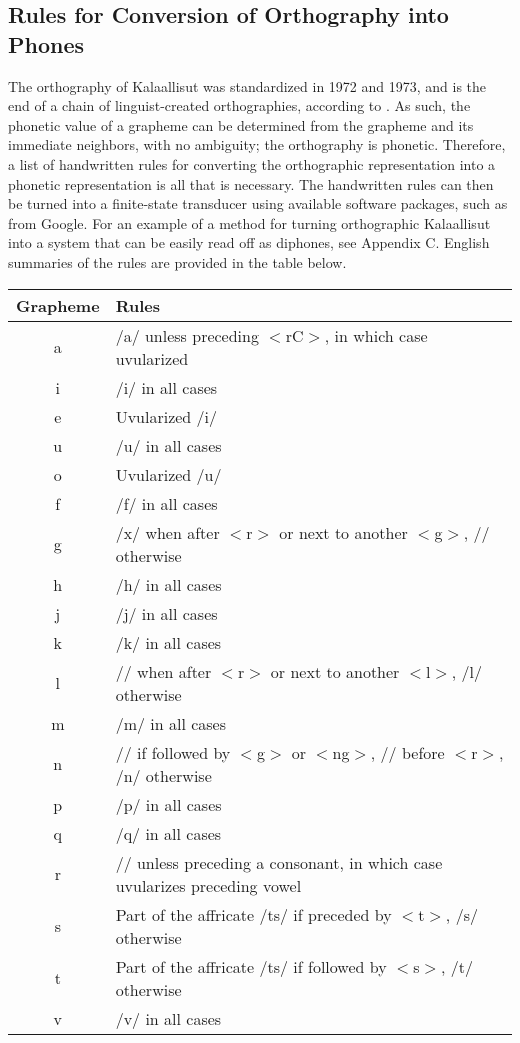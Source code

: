 \documentclass[12pt]{article}
\begin{document}
	\subsection{Rules for Conversion of Orthography into Phones}

	The orthography of Kalaallisut was standardized in 1972 and 1973, and is the end of a chain of linguist-created orthographies, according to \citet{rischel}. As such, the phonetic value of a grapheme can be determined from the grapheme and its immediate neighbors, with no ambiguity; the orthography is phonetic. Therefore, a list of handwritten rules for converting the orthographic representation into a phonetic representation is all that is necessary. The handwritten rules can then be turned into a finite-state transducer using available software packages, such as from Google. For an example of a method for turning orthographic Kalaallisut into a system that can be easily read off as diphones, see Appendix C. English summaries of the rules are provided in the table below.\par

	\begin{tabular}{|c|l|}
	\hline
	Grapheme & Rules \\
	\hline
	a & /a/ unless preceding $<$rC$>$, in which case uvularized\\
	i & /i/ in all cases\\
	e & Uvularized /i/\\
	u & /u/ in all cases\\
	o & Uvularized /u/\\
	f & /f/ in all cases\\
	g & /x/ when after $<$r$>$ or next to another $<$g$>$, /\textipa{G}/ otherwise\\
	h & /h/ in all cases\\
	j & /j/ in all cases\\
	k & /k/ in all cases\\
	l & /\textbeltl/ when after $<$r$>$ or next to another $<$l$>$, /l/ otherwise\\
	m & /m/ in all cases\\
	n & /\textipa{N}/ if followed by $<$g$>$ or $<$ng$>$, /\textscn/ before $<$r$>$, /n/ otherwise\\
	p & /p/ in all cases\\
	q & /q/ in all cases\\
	r & /\textinvscr/ unless preceding a consonant, in which case uvularizes preceding vowel\\
	s & Part of the affricate /ts/ if preceded by $<$t$>$, /s/ otherwise\\
	t & Part of the affricate /ts/ if followed by $<$s$>$, /t/ otherwise\\
	v & /v/ in all cases\\
	\hline
	\end{tabular}
\end{document}
